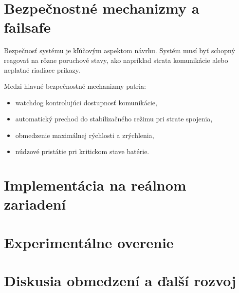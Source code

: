 \documentclass[a4paper,12pt]{article}
\begin{document}
\section{Bezpečnostné mechanizmy a failsafe}

Bezpečnosť systému je kľúčovým aspektom návrhu. Systém musí byť schopný reagovať na rôzne 
poruchové stavy, ako napríklad strata komunikácie alebo neplatné riadiace príkazy.

Medzi hlavné bezpečnostné mechanizmy patria:

\begin{itemize}
\item watchdog kontrolujúci dostupnosť komunikácie,
\item automatický prechod do stabilizačného režimu pri strate spojenia,
\item obmedzenie maximálnej rýchlosti a zrýchlenia,
\item núdzové pristátie pri kritickom stave batérie.
\end{itemize}



\section{Implementácia na reálnom zariadení}

\section{Experimentálne overenie}

\section{Diskusia obmedzení a ďalší rozvoj}
\end{document}

